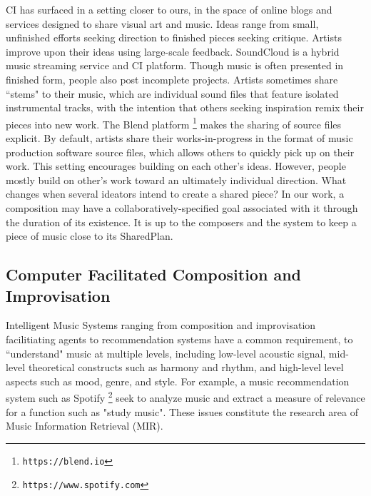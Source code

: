 \documentclass[final,authoryear,5p,times,twocolumn]{elsarticle}
\begin{document}
CI has surfaced in a setting closer to ours, in the space of online blogs and services designed to share visual art and music. Ideas range from small, unfinished efforts seeking direction to finished pieces seeking critique. Artists improve upon their ideas using large-scale feedback. SoundCloud is a hybrid music streaming service and CI platform. Though music is often presented in finished form, people also post incomplete projects. Artists sometimes share ``stems" to their music, which are individual sound files that feature isolated instrumental tracks, with the intention that others seeking inspiration remix their pieces into new work. The Blend platform \footnote{\texttt{https://blend.io}} makes the sharing of source files explicit. By default, artists share their works-in-progress in the format of music production software source files, which allows others to quickly pick up on their work. This setting encourages building on each other's ideas. However, people mostly build on other's work toward an ultimately individual direction. What changes when several ideators intend to create a shared piece? In our work, a composition may have a collaboratively-specified goal associated with it through the duration of its existence. It is up to the composers and the system to keep a piece of music close to its SharedPlan.

\subsection{Computer Facilitated Composition and Improvisation}

Intelligent Music Systems ranging from composition and improvisation facilitiating agents to recommendation systems have a common requirement, to ``understand" music at multiple levels, including low-level acoustic signal, mid-level theoretical constructs such as harmony and rhythm, and high-level level aspects such as mood, genre, and style. For example, a music recommendation system such as Spotify \footnote{\texttt{https://www.spotify.com}} seek to analyze music and extract a measure of relevance for a function such as "study music". These issues constitute the research area of Music Information Retrieval (MIR).
\end{document}
